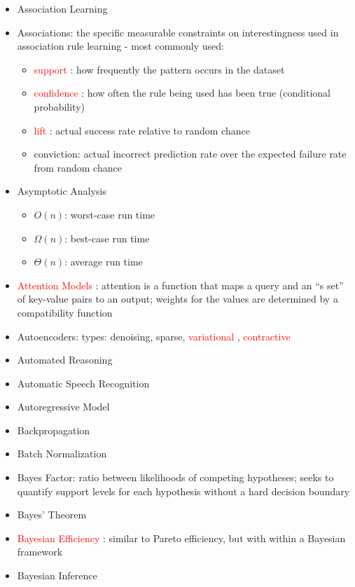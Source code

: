 \documentclass[a4paper]{article}
\newcommand{\cmark}{\ding{51}}%
\newcommand{\done}{\rlap{$\square$}{\raisebox{2pt}{\large\hspace{1pt}\cmark}}\hspace{-2.5pt}}
\newcommand{\followup}[1]{\textcolor{red}{ #1 }}
\begin{document}
\begin{itemize}
    \item [\done] Association Learning
    \item [\done] Associations: the specific measurable constraints on interestingness used in association rule learning - most commonly used:
    \begin{itemize}
        \item \followup{support}: how frequently the pattern occurs in the dataset
        \item \followup{confidence}: how often the rule being used has been true (conditional probability)
        \item \followup{lift}: actual success rate relative to random chance
        \item conviction: actual incorrect prediction rate over the expected failure rate from random chance
    \end{itemize}
    \item [\done] Asymptotic Analysis
    \begin{itemize}
        \item $O(n)$: worst-case run time
        \item $\Omega(n)$: best-case run time
        \item $\Theta(n)$: average run time
    \end{itemize}
    \item [\done] \followup{Attention Models}: attention is a function that maps a query and an ``s set'' of key-value pairs to an output; weights for the values are determined by a compatibility function
    \item [\done] Autoencoders: types: denoising, sparse, \followup{variational}, \followup{contractive}
    \item [\done] Automated Reasoning
    \item [\done] Automatic Speech Recognition
    \item [\done] Autoregressive Model
    \item [\done] Backpropagation
    \item [\done] Batch Normalization
    \item [\done] Bayes Factor: ratio between likelihoods of competing hypotheses; seeks to quantify support levels for each hypothesis without a hard decision boundary
    \item [\done] Bayes' Theorem
    \item [\done] \followup{Bayesian Efficiency}: similar to Pareto efficiency, but with within a Bayesian framework
    \item [\done] Bayesian Inference

\end{itemize}
\end{document}
